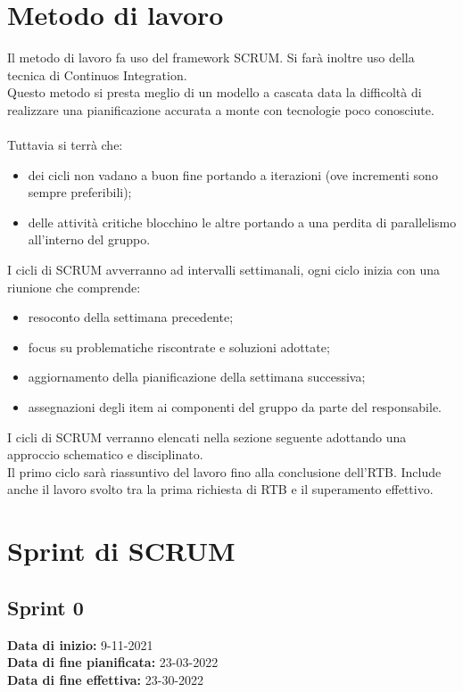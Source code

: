\documentclass[a4paper, 12pt]{article}
\begin{document}
\section{Metodo di lavoro}
Il metodo di lavoro fa uso del framework SCRUM. Si farà inoltre uso della tecnica di Continuos Integration.\\
Questo metodo si presta meglio di un modello a cascata data la difficoltà di realizzare una pianificazione accurata a monte con tecnologie poco conosciute.\\\\
Tuttavia si terrà che:
\begin{itemize}
    \item dei cicli non vadano a buon fine portando a iterazioni (ove incrementi sono sempre preferibili);
    \item delle attività critiche blocchino le altre portando a una perdita di parallelismo all'interno del gruppo.
\end{itemize}
I cicli di SCRUM avverranno ad intervalli settimanali, ogni ciclo inizia con una riunione che comprende:
\begin{itemize}
    \item resoconto della settimana precedente;
    \item focus su problematiche riscontrate e soluzioni adottate;
    \item aggiornamento della pianificazione della settimana successiva;
    \item assegnazioni degli item ai componenti del gruppo da parte del responsabile.
\end{itemize}
I cicli di SCRUM verranno elencati nella sezione seguente adottando una approccio schematico e disciplinato.\\
Il primo ciclo sarà riassuntivo del lavoro fino alla conclusione dell'RTB. Include anche il lavoro svolto tra la prima richiesta di RTB e il superamento effettivo.

\section{Sprint di SCRUM}

\subsection{Sprint 0}
\textbf{Data di inizio:} 9-11-2021\\
\textbf{Data di fine pianificata:} 23-03-2022\\
\textbf{Data di fine effettiva:} 23-30-2022
\end{document}
